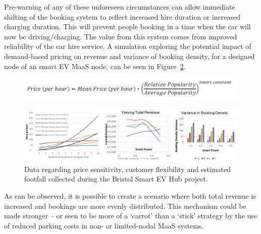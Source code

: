 \documentclass[journal]{IEEEtran}
\begin{document}
Pre-warning of any of these unforeseen circumstances can allow
immediate shifting of the booking system to reflect increased hire
duration or increased charging duration. This will prevent people
booking in a time when the car will now be driving/charging. The value
from this system comes from improved reliability of the car hire
service. A simulation exploring the potential impact of demand-based
pricing on revenue and variance of booking density, for a designed
node of an smart EV MaaS node, can be seen in
Figure~\ref{fig:smartpricegraphs}.

\begin{figure}[!h]
\centering
\includegraphics[width=\columnwidth]{images/smartpricingformula.png}
\label{fig:smartpricingformula}
\end{figure}

\begin{figure}[!htb]
\centering
\includegraphics[width=\textwidth]{images/smartpricegraphs.png}
\caption{Data regarding price sensitivity, customer flexibility and
estimated footfall collected during the Bristol Smart EV Hub project.}
\label{fig:smartpricegraphs}
\end{figure}


As can be observed, it is possible to create a scenario where both
total revenue is increased and bookings are more evenly
distributed. This mechanism could be made stronger -- or seen to be
more of a `carrot' than a `stick' strategy by the use of reduced
parking costs in non- or limited-nodal MaaS systems.
\end{document}
